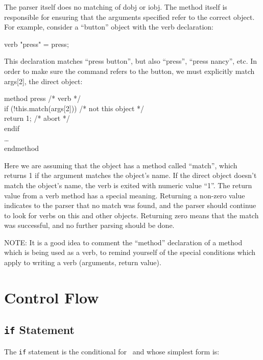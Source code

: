 The parser itself does no matching of dobj or iobj.  The method
itself is responsible for ensuring that the arguments specified
refer to the correct object.  For example, consider a ``button''
object with the verb declaration:

\begin{code}
verb "press" = press;
\end{code}

This declaration matches ``press button'', but also ``press'', ``press nancy'',
etc.  In order to make sure the command refers to the button, we must
explicitly match args[2], the direct object:

\begin{code}
	     method press /* verb */	\\
\ind	         if (!this.match(args[2]))	/* not this object */	\\
\ind \ind            return 1;		/* abort */ \\
\ind	         endif \\
\ind	         \ldots \\
	     endmethod
\end{code}

Here we are assuming that the object has a method called ``match'',
which returns 1 if the argument matches the object's name.  If
the direct object doesn't match the object's name, the verb
is exited with numeric value ``1''.  The return value from a
verb method has a special meaning.  Returning a non-zero value
indicates to the parser that no match was found, and the parser
should continue to look for verbs on this and other objects.  Returning
zero means that the match was successful, and no further parsing should
be done.

NOTE:  It is a good idea to comment the ``method'' declaration of a
       method which is being used as a verb, to remind yourself of the
       special conditions which apply to writing a verb (arguments,
       return value).

\section{Control Flow}

\subsection{{\tt if} Statement}

The {\tt if} statement is the conditional for \COOL\,
and whose simplest form is:

